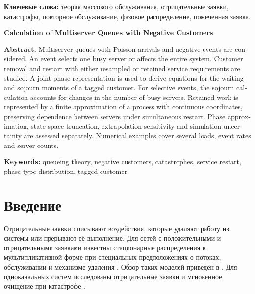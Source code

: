 \begin{abstract}
Рассматриваются многоканальные системы массового обслуживания с пуассоновскими поступлениями и отрицательными воздействиями. Воздействие выбирает один занятый канал либо одновременно затрагивает всю систему. Исследуются удаление заявок и повторное обслуживание с новой или с первоначально выбранной длительностью. Для фазового обслуживания описано совместное состояние каналов и построены уравнения моментов ожидания и пребывания помеченной заявки. Время пребывания при выборочных воздействиях рассчитывается с учётом изменения числа занятых каналов. Для сохранённой работы используется конечная аппроксимация процесса с непрерывными координатами; зависимость каналов при общих прерываниях сохраняется. Отдельно проверяются фазовая аппроксимация, усечение пространства состояний, экстраполяция и статистическая неопределённость имитации. Приведены результаты для нескольких нагрузок, интенсивностей воздействий и числа каналов.
\end{abstract}
\textbf{Ключевые слова:} теория массового обслуживания, отрицательные заявки, катастрофы, повторное обслуживание, фазовое распределение, помеченная заявка.

\begin{otherlanguage}{english}
\bigskip
\begin{center}\textbf{Calculation of Multiserver Queues with Negative Customers}\end{center}
\textbf{Abstract.} Multiserver queues with Poisson arrivals and negative events are considered. An event selects one busy server or affects the entire system. Customer removal and restart with either resampled or retained service requirements are studied. A joint phase representation is used to derive equations for the waiting and sojourn moments of a tagged customer. For selective events, the sojourn calculation accounts for changes in the number of busy servers. Retained work is represented by a finite approximation of a process with continuous coordinates, preserving dependence between servers under simultaneous restart. Phase approximation, state-space truncation, extrapolation sensitivity and simulation uncertainty are assessed separately. Numerical examples cover several loads, event rates and server counts.

\textbf{Keywords:} queueing theory, negative customers, catastrophes, service restart, phase-type distribution, tagged customer.
\end{otherlanguage}

\section{Введение}
Отрицательные заявки описывают воздействия, которые удаляют работу из системы или прерывают её выполнение. Для сетей с положительными и отрицательными заявками известны стационарные распределения в мультипликативной форме при специальных предположениях о потоках, обслуживании и механизме удаления \cite{gelenbe1991,gelenbe1992}. Обзор таких моделей приведён в \cite{artalejo2000}. Для одноканальных систем исследованы отрицательные заявки \cite{harrison1996} и мгновенное очищение при катастрофе \cite{jain1996}.


